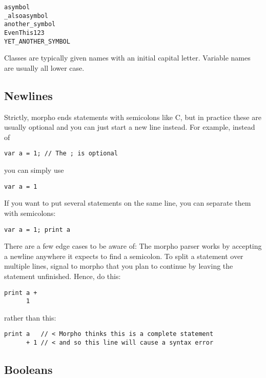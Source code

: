 \begin{lstlisting}
asymbol
_alsoasymbol
another_symbol
EvenThis123
YET_ANOTHER_SYMBOL
\end{lstlisting}

Classes are typically given names with an initial capital letter.
Variable names are usually all lower case.

\hypertarget{newlines}{%
\subsection{Newlines}\label{newlines}}

Strictly, morpho ends statements with semicolons like C, but in practice
these are usually optional and you can just start a new line instead.
For example, instead of

\begin{lstlisting}
var a = 1; // The ; is optional
\end{lstlisting}

you can simply use

\begin{lstlisting}
var a = 1
\end{lstlisting}

If you want to put several statements on the same line, you can separate
them with semicolons:

\begin{lstlisting}
var a = 1; print a
\end{lstlisting}

There are a few edge cases to be aware of: The morpho parser works by
accepting a newline anywhere it expects to find a semicolon. To split a
statement over multiple lines, signal to morpho that you plan to
continue by leaving the statement unfinished. Hence, do this:

\begin{lstlisting}
print a +
      1
\end{lstlisting}

rather than this:

\begin{lstlisting}
print a   // < Morpho thinks this is a complete statement
      + 1 // < and so this line will cause a syntax error
\end{lstlisting}

\hypertarget{booleans}{%
\subsection{Booleans}\label{booleans}}


